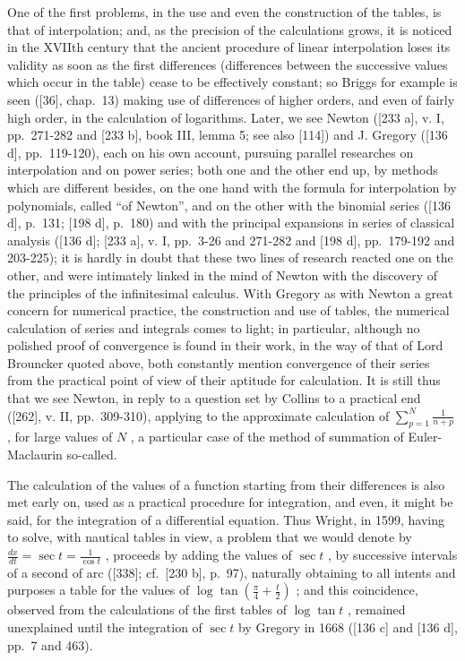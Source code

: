 One of the first problems, in the use and even the construction of the tables, is that of interpolation; and, as the precision of the calculations grows, it is noticed in the XVIIth century that the ancient procedure of linear interpolation loses its validity as soon as the first differences (differences between the successive values which occur in the table) cease to be effectively constant; so Briggs for example is seen ({[}36{]}, chap.~13) making use of differences of higher orders, and even of fairly high order, in the calculation of logarithms. Later, we see Newton ({[}233 a{]}, v. I, pp.~271-282 and {[}233 b{]}, book III, lemma 5; see also {[}114{]}) and J. Gregory ({[}136 d{]}, pp.~119-120), each on his own account, pursuing parallel researches on interpolation and on power series; both one and the other end up, by methods which are different besides, on the one hand with the formula for interpolation by polynomials, called ``of Newton'', and on the other with the binomial series ({[}136 d{]}, p.~131; {[}198 d{]}, p.~180) and with the principal expansions in series of classical analysis ({[}136 d{]}; {[}233 a{]}, v. I, pp.~3-26 and 271-282 and {[}198 d{]}, pp.~179-192 and 203-225); it is hardly in doubt that these two lines of research reacted one on the other, and were intimately linked in the mind of Newton with the discovery of the principles of the infinitesimal calculus. With Gregory as with Newton a great concern for numerical practice, the construction and use of tables, the numerical calculation of series and integrals comes to light; in particular, although no polished proof of convergence is found in their work, in the way of that of Lord Brouncker quoted above, both constantly mention convergence of their series from the practical point of view of their aptitude for calculation. It is still thus that we see Newton, in reply to a question set by Collins to a practical end ({[}262{]}, v. II, pp.~309-310), applying to the approximate calculation of \(\sum_{p=1}^{N} \frac{1}{n+p}\) , for large values of \(N\) , a particular case of the method of summation of Euler-Maclaurin so-called.

The calculation of the values of a function starting from their differences is also met early on, used as a practical procedure for integration, and even, it might be said, for the integration of a differential equation. Thus Wright, in 1599, having to solve, with nautical tables in view, a problem that we would denote by \(\frac{dx}{dt} = \sec t = \frac{1}{\cos t}\) , proceeds by adding the values of \(\sec t\) , by successive intervals of a second of arc ({[}338{]}; cf.~{[}230 b{]}, p.~97), naturally obtaining to all intents and purposes a table for the values of \(\log \tan (\frac{\pi}{4} + \frac{t}{2})\) ; and this coincidence, observed from the calculations of the first tables of \(\log \tan t\) , remained unexplained until the integration of \(\sec t\) by Gregory in 1668 ({[}136 c{]} and {[}136 d{]}, pp.~7 and 463).

